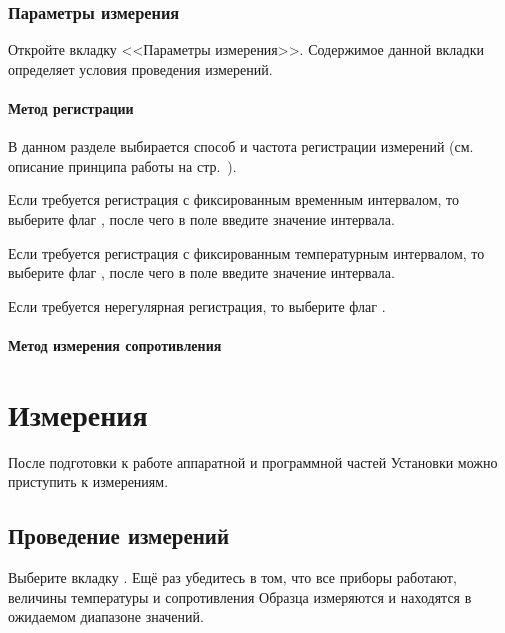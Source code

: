 \documentclass[12pt, a4paper, twocolumn]{report}
\begin{document}


\subsection{Параметры измерения}

Откройте вкладку <<Параметры измерения>>. Содержимое данной вкладки определяет условия проведения измерений.

\subsubsection{Метод регистрации}
\label{sec_reg_method}

В данном разделе выбирается способ и частота регистрации измерений (см. описание принципа работы на стр.~\pageref{sec_registration_types}).

Если требуется регистрация с фиксированным временным интервалом, то выберите флаг , после чего в поле  введите значение интервала.

Если требуется регистрация с фиксированным температурным интервалом, то выберите флаг , после чего в поле  введите значение интервала.

Если требуется нерегулярная регистрация, то выберите флаг .

\subsubsection{Метод измерения сопротивления}



\chapter{Измерения}

После подготовки к работе аппаратной и программной частей Установки можно приступить к измерениям.

\section{Проведение измерений}

Выберите вкладку . Ещё раз убедитесь в том, что все приборы работают, величины температуры и сопротивления Образца измеряются и находятся в ожидаемом диапазоне значений.
\end{document}
